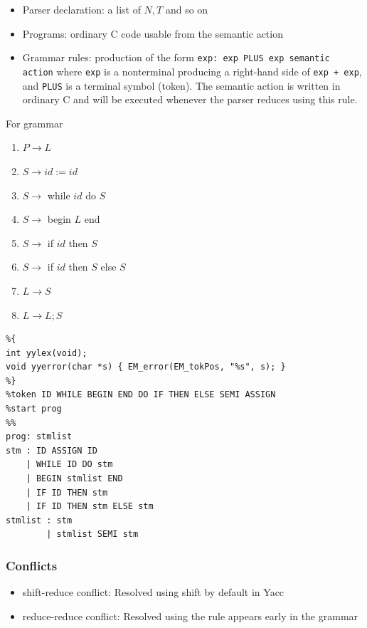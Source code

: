 \begin{itemize}
    \item Parser declaration: a list of $N, T$ and so on
    \item Programs: ordinary C code usable from the semantic action
    \item Grammar rules: production of the form
    \subitem \texttt{exp: exp PLUS exp {semantic action}}  
    \subitem where \texttt{exp} is a nonterminal producing a right-hand side of \texttt{exp + exp}, and \texttt{PLUS} is a terminal symbol (token). The semantic action is written in ordinary C and will be executed whenever the parser reduces using this rule.
\end{itemize}

\begin{example}
    For grammar
    \begin{enumerate}
        \item $P \to L$
        \item $S \to id := id$
        \item $S \to$ while $id$ do $S$
        \item $S \to$ begin $L$ end
        \item $S \to$ if $id$ then $S$
        \item $S \to$ if $id$ then $S$ else $S$
        \item $L \to S$
        \item $L \to L ; S$
    \end{enumerate}

    \begin{verbatim}
%{
int yylex(void);
void yyerror(char *s) { EM_error(EM_tokPos, "%s", s); }
%}
%token ID WHILE BEGIN END DO IF THEN ELSE SEMI ASSIGN
%start prog
%%
prog: stmlist
stm : ID ASSIGN ID
    | WHILE ID DO stm
    | BEGIN stmlist END
    | IF ID THEN stm
    | IF ID THEN stm ELSE stm
stmlist : stm
        | stmlist SEMI stm
    \end{verbatim}
    
\end{example}

\subsubsection{Conflicts}
\begin{itemize}
    \item shift-reduce conflict: Resolved using shift by default in Yacc
    \item reduce-reduce conflict: Resolved using the rule appears early in the grammar
\end{itemize}

